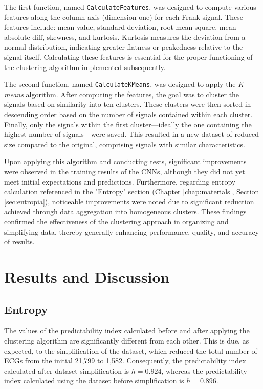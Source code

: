 \documentclass[12pt,italian]{report}
\begin{document}
The first function, named \texttt{CalculateFeatures}, was designed to compute various features along the column axis (dimension one) for each Frank signal. These features include: mean value, standard deviation, root mean square, mean absolute diff, skewness, and kurtosis. Kurtosis measures the deviation from a normal distribution, indicating greater flatness or peakedness relative to the signal itself. Calculating these features is essential for the proper functioning of the clustering algorithm implemented subsequently.

The second function, named \texttt{CalculateKMeans}, was designed to apply the \textit{K-means} algorithm. After computing the features, the goal was to cluster the signals based on similarity into ten clusters. These clusters were then sorted in descending order based on the number of signals contained within each cluster. Finally, only the signals within the first cluster—ideally the one containing the highest number of signals—were saved. This resulted in a new dataset of reduced size compared to the original, comprising signals with similar characteristics.

Upon applying this algorithm and conducting tests, significant improvements were observed in the training results of the CNNs, although they did not yet meet initial expectations and predictions. Furthermore, regarding entropy calculation referenced in the "Entropy" section (Chapter \ref{chap:materials}, Section \ref{sec:entropia}), noticeable improvements were noted due to significant reduction achieved through data aggregation into homogeneous clusters. These findings confirmed the effectiveness of the clustering approach in organizing and simplifying data, thereby generally enhancing performance, quality, and accuracy of results.

\chapter{Results and Discussion}
\label{chap:risultati}

\section{Entropy}
\label{sec:entropia_risultati}

The values of the predictability index calculated before and after applying the clustering algorithm are significantly different from each other. This is due, as expected, to the simplification of the dataset, which reduced the total number of ECGs from the initial 21,799 to 1,582. Consequently, the predictability index calculated after dataset simplification is $ h = 0.924 $, whereas the predictability index calculated using the dataset before simplification is $ h = 0.896 $.
\end{document}
